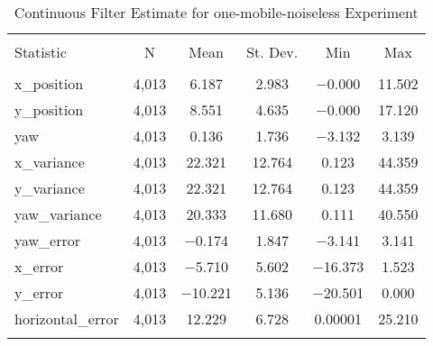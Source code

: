 
\begin{table}[h] \centering 
  \caption{Continuous Filter Estimate for one-mobile-noiseless Experiment} 
  \label{tab:one_mobile_noiseless_continuous_summary} 
\begin{tabular}{@{\extracolsep{5pt}}lccccc} 
\\[-1.8ex]\hline 
\hline \\[-1.8ex] 
Statistic & \multicolumn{1}{c}{N} & \multicolumn{1}{c}{Mean} & \multicolumn{1}{c}{St. Dev.} & \multicolumn{1}{c}{Min} & \multicolumn{1}{c}{Max} \\ 
\hline \\[-1.8ex] 
x\_position & 4,013 & 6.187 & 2.983 & $-$0.000 & 11.502 \\ 
y\_position & 4,013 & 8.551 & 4.635 & $-$0.000 & 17.120 \\ 
yaw & 4,013 & 0.136 & 1.736 & $-$3.132 & 3.139 \\ 
x\_variance & 4,013 & 22.321 & 12.764 & 0.123 & 44.359 \\ 
y\_variance & 4,013 & 22.321 & 12.764 & 0.123 & 44.359 \\ 
yaw\_variance & 4,013 & 20.333 & 11.680 & 0.111 & 40.550 \\ 
yaw\_error & 4,013 & $-$0.174 & 1.847 & $-$3.141 & 3.141 \\ 
x\_error & 4,013 & $-$5.710 & 5.602 & $-$16.373 & 1.523 \\ 
y\_error & 4,013 & $-$10.221 & 5.136 & $-$20.501 & 0.000 \\ 
horizontal\_error & 4,013 & 12.229 & 6.728 & 0.00001 & 25.210 \\ 
\hline \\[-1.8ex] 
\end{tabular} 
\end{table} 
